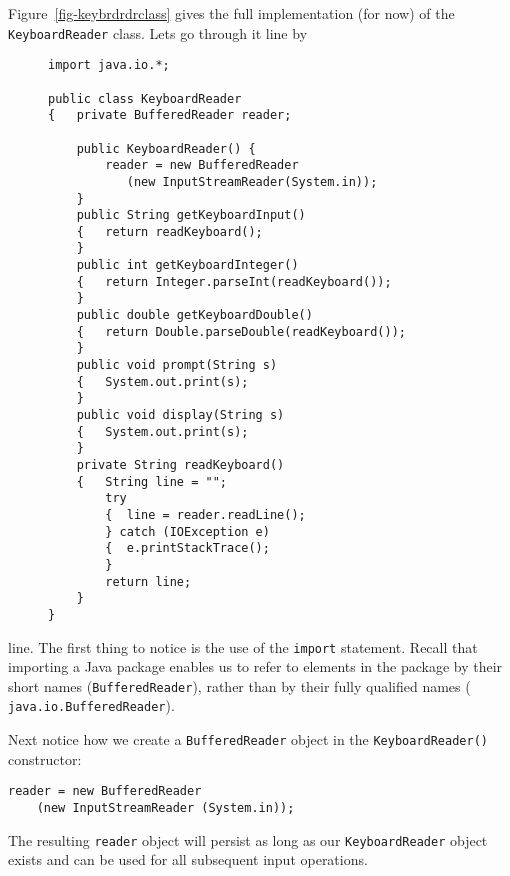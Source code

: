 Figure~\ref{fig-keybrdrdrclass} gives the full implementation (for
now) of the {\tt Key\-board\-Read\-er} class. Lets go through it line by
\begin{figure}[h!]
\jjjprogstart
\begin{jjjlisting}
\begin{lstlisting}
import java.io.*;

public class KeyboardReader 
{   private BufferedReader reader;

    public KeyboardReader() {
        reader = new BufferedReader
           (new InputStreamReader(System.in));
    }
    public String getKeyboardInput() 
    {   return readKeyboard();
    }
    public int getKeyboardInteger() 
    {   return Integer.parseInt(readKeyboard());
    }
    public double getKeyboardDouble() 
    {   return Double.parseDouble(readKeyboard());
    }
    public void prompt(String s) 
    {   System.out.print(s);
    }
    public void display(String s) 
    {   System.out.print(s);
    }
    private String readKeyboard() 
    {   String line = "";
        try 
        {  line = reader.readLine();
        } catch (IOException e) 
        {  e.printStackTrace();
        }
        return line;
    }
}
\end{lstlisting}
\end{jjjlisting}
\end{figure}
line. The first thing to notice is the use of the {\tt import}
statement. Recall that importing a Java package enables us to refer to
elements in the package by their short names ({\tt BufferedReader}),
rather than by their fully qualified names ({\tt
java.io.BufferedReader}).


Next notice how we create a {\tt BufferedReader} object in
the {\tt KeyboardReader()} constructor:

\begin{jjjlisting}
\begin{lstlisting}
reader = new BufferedReader 
    (new InputStreamReader (System.in)); 
\end{lstlisting}
\end{jjjlisting}

\noindent The resulting {\tt reader} object will persist as long
as our {\tt KeyboardReader} object exists and can be used for
all subsequent input operations.


